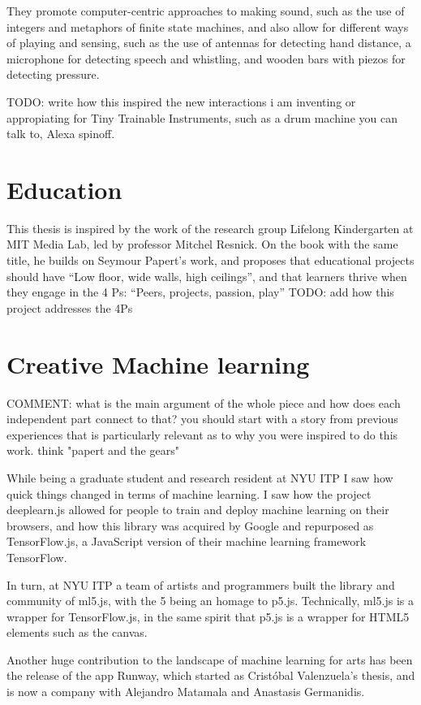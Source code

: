 They promote computer-centric approaches to making sound, such as the use of integers and metaphors of finite state machines, and also allow for different ways of playing and sensing, such as the use of antennas for detecting hand distance, a microphone for detecting speech and whistling, and wooden bars with piezos for detecting pressure.

TODO: write how this inspired the new interactions i am inventing or appropiating for Tiny Trainable Instruments, such as a drum machine you can talk to, Alexa spinoff.

\section{Education}

This thesis is inspired by the work of the research group Lifelong Kindergarten at MIT Media Lab, led by professor Mitchel Resnick. On the book with the same title, he builds on Seymour Papert’s work, and proposes that educational projects should have “Low floor, wide walls, high ceilings”, and that learners thrive when they engage in the 4 Ps: “Peers, projects, passion, play”
TODO: add how this project addresses the 4Ps

\section{Creative Machine learning}

COMMENT: what is the main argument of the whole piece and how does each independent part connect to that? you should start with a story from previous experiences that is particularly relevant as to why you were inspired to do this work. think "papert and the gears"

While being a graduate student and research resident at NYU ITP I saw how quick things changed in terms of machine learning. I saw how the project deeplearn.js allowed for people to train and deploy machine learning on their browsers, and how this library was acquired by Google and repurposed as TensorFlow.js, a JavaScript version of their machine learning framework TensorFlow.

In turn, at NYU ITP a team of artists and programmers built the library and community of ml5.js, with the 5 being an homage to p5.js. Technically, ml5.js is a wrapper for TensorFlow.js, in the same spirit that p5.js is a wrapper for HTML5 elements such as the canvas.

Another huge contribution to the landscape of machine learning for arts has been the release of the app Runway, which started as Cristóbal Valenzuela’s thesis, and is now a company with Alejandro Matamala and Anastasis Germanidis.


